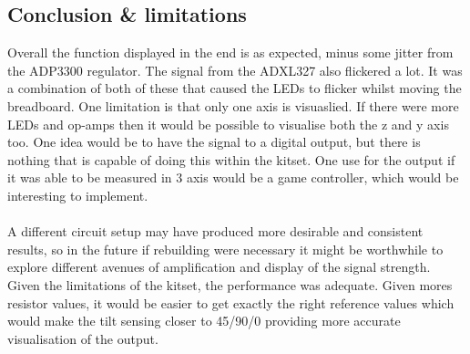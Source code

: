 \documentclass[12pt]{article}
\begin{document}
    \subsection{Conclusion \& limitations}
    Overall the function displayed in the end is as expected, minus some jitter from the ADP3300 regulator. The signal from the ADXL327 also flickered a lot. It was a combination
    of both of these that caused the LEDs to flicker whilst moving the breadboard. One limitation is that only one axis is visuaslied. If there were more LEDs and op-amps
    then it would be possible to visualise both the z and y axis too. One idea would be to have the signal to a digital output, but there is nothing that is capable of doing
    this within the kitset. One use for the output if it was able to be measured in 3 axis would be a game controller, which would be interesting to implement. \\ \\
    A different circuit setup may have produced more desirable and consistent results, so in the future if rebuilding were necessary it might be worthwhile to explore different
    avenues of amplification and display of the signal strength. Given the limitations of the kitset, the performance was adequate. Given mores resistor values, it would be
    easier to get exactly the right reference values which would make the tilt sensing closer to 45/90/0 providing more accurate visualisation of the output. 
\end{document}
